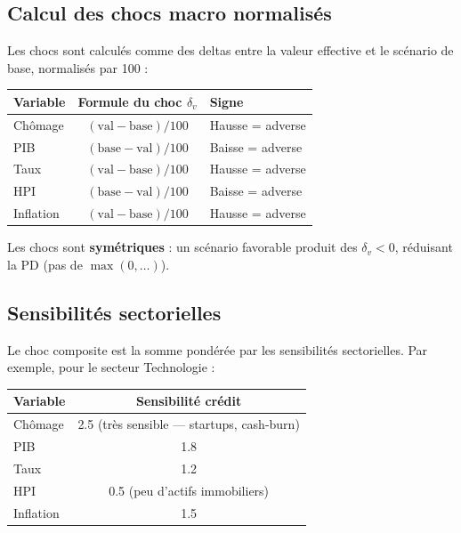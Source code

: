 \documentclass[12pt,a4paper]{article}
\begin{document}
\subsection{Calcul des chocs macro normalis\'es}

Les chocs sont calcul\'es comme des deltas entre la valeur effective et le sc\'enario de base, normalis\'es par 100 :

\begin{center}
\begin{tabular}{lcl}
\toprule
\textbf{Variable} & \textbf{Formule du choc $\delta_v$} & \textbf{Signe} \\
\midrule
Ch\^omage & $(\text{val} - \text{base}) / 100$ & Hausse = adverse \\
PIB       & $(\text{base} - \text{val}) / 100$ & Baisse = adverse \\
Taux      & $(\text{val} - \text{base}) / 100$ & Hausse = adverse \\
HPI       & $(\text{base} - \text{val}) / 100$ & Baisse = adverse \\
Inflation & $(\text{val} - \text{base}) / 100$ & Hausse = adverse \\
\bottomrule
\end{tabular}
\end{center}

Les chocs sont \textbf{sym\'etriques} : un sc\'enario favorable produit des $\delta_v < 0$, r\'eduisant la PD (pas de $\max(0, \ldots)$).

\subsection{Sensibilit\'es sectorielles}

Le choc composite est la somme pond\'er\'ee par les sensibilit\'es sectorielles. Par exemple, pour le secteur Technologie :

\begin{center}
\begin{tabular}{lc}
\toprule
\textbf{Variable} & \textbf{Sensibilit\'e cr\'edit} \\
\midrule
Ch\^omage  & 2.5 (tr\`es sensible --- startups, cash-burn) \\
PIB        & 1.8 \\
Taux       & 1.2 \\
HPI        & 0.5 (peu d'actifs immobiliers) \\
Inflation  & 1.5 \\
\bottomrule
\end{tabular}
\end{center}
\end{document}
